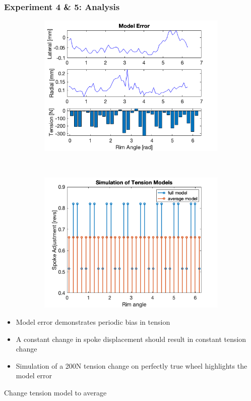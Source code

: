 \documentclass[mathserif]{beamer}
\begin{document}
\begin{frame}
\frametitle{Experiment 4 \& 5: Analysis}
\begin{figure}
             \centering
        \begin{subfigure}[b]{0.45\textwidth}
            \includegraphics[width=\textwidth]{exp4_model_err}
        \end{subfigure}
        ~
        \begin{subfigure}[b]{0.45\textwidth}
            \includegraphics[width=\textwidth]{sim_ten_mdls}
        \end{subfigure}
\end{figure}
\begin{itemize}
\item Model error demonstrates periodic bias in tension 
\item A constant change in spoke displacement should result in constant tension change
\item Simulation of a 200N tension change on perfectly true wheel highlights the model error
\end{itemize}
\begin{block}{}
    Change tension model to average 
\end{block}
\end{frame}
\end{document}
